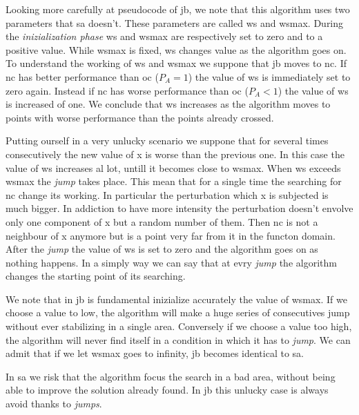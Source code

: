 \documentclass[journal]{IEEEtran}
\begin{document}
Looking more carefully at pseudocode of \gls{jb}, we note that this algorithm uses two parameters that \gls{sa} doesn't. These parameters are called \gls{ws} and \gls{wsmax}. During the \textit{inizialization phase}  \gls{ws} and \gls{wsmax} are respectively set to zero and to a positive value. While \gls{wsmax} is fixed, \gls{ws} changes value as the algorithm goes on. To understand the working of \gls{ws} and \gls{wsmax} we suppone that \gls{jb} moves to \gls{nc}. If \gls{nc} has better performance than \gls{oc} ($P_A=1$) the value of \gls{ws} is immediately set to zero again. Instead if \gls{nc} has worse performance than \gls{oc} ($P_A<1$) the value of \gls{ws} is increased of one. We conclude that \gls{ws} increases as the algorithm moves to points with worse performance than the points already crossed.

Putting ourself in a very unlucky scenario we suppone that for several times consecutively the new value of \gls{x} is worse than the previous one. In this case the value of \gls{ws} increases al lot, untill it becomes close to \gls{wsmax}. When \gls{ws} exceeds \gls{wsmax} the \textit{jump} takes place. This mean that for a single time the searching for \gls{nc} change its working. In particular the perturbation which \gls{x} is subjected is much bigger. In addiction to have more intensity the perturbation doesn't envolve only one component of \gls{x} but a random number of them. Then \gls{nc} is not a neighbour of \gls{x} anymore but is a point very far from it in the functon domain. After the \textit{jump} the value of \gls{ws} is set to zero and the algorithm goes on as nothing happens. In a simply way we can say that at evry \textit{jump} the algorithm changes the starting point of its searching.

We note that in \gls{jb} is fundamental inizialize accurately the value of \gls{wsmax}. If we choose a value to low, the algorithm will make a huge series of consecutives jump without ever stabilizing in a single area. Conversely if we choose a value too high, the algorithm will never find itself in a condition in which it has to \textit{jump}. We can admit that if we let \gls{wsmax} goes to infinity, \gls{jb} becomes identical to \gls{sa}.

In \gls{sa} we risk that the algorithm focus the search in a bad area, without being able to improve the solution already found. In \gls{jb} this unlucky case is always avoid thanks to \textit{jumps}.
\end{document}
